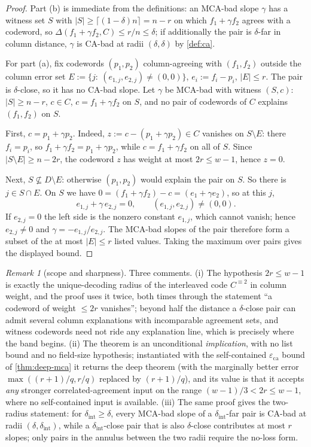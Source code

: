 \documentclass[11pt]{article}
\theoremstyle{definition}
\theoremstyle{remark}
\newtheorem{remark}[remark]{Remark}
\newcommand{\eca}{\varepsilon_{\mathrm{ca}}}
\newcommand{\dist}{\Delta}
\begin{document}
\begin{proof}
Part \textup{(b)} is immediate from the definitions: an MCA-bad slope $\gamma$ has a witness set $S$ with $|S|\ge\lceil(1-\delta)n\rceil=n-r$ on which $f_1+\gamma f_2$ agrees with a codeword, so $\dist(f_1+\gamma f_2,C)\le r/n\le\delta$; if additionally the pair is $\delta$-far in column distance, $\gamma$ is CA-bad at radii $(\delta,\delta)$ by \cref{def:ca}.

For part \textup{(a)}, fix codewords $(p_1,p_2)$ column-agreeing with $(f_1,f_2)$ outside the column error set $E:=\{j:\ (e_{1,j},e_{2,j})\ne(0,0)\}$, $e_i:=f_i-p_i$, $|E|\le r$. The pair is $\delta$-close, so it has no CA-bad slope. Let $\gamma$ be MCA-bad with witness $(S,c)$: $|S|\ge n-r$, $c\in C$, $c=f_1+\gamma f_2$ on $S$, and no pair of codewords of $C$ explains $(f_1,f_2)$ on $S$.

First, $c=p_1+\gamma p_2$. Indeed, $z:=c-(p_1+\gamma p_2)\in C$ vanishes on $S\setminus E$: there $f_i=p_i$, so $f_1+\gamma f_2=p_1+\gamma p_2$, while $c=f_1+\gamma f_2$ on all of $S$. Since $|S\setminus E|\ge n-2r$, the codeword $z$ has weight at most $2r\le w-1$, hence $z=0$.

Next, $S\not\subseteq D\setminus E$: otherwise $(p_1,p_2)$ would explain the pair on $S$. So there is $j\in S\cap E$. On $S$ we have $0=(f_1+\gamma f_2)-c=(e_1+\gamma e_2)$, so at this $j$,
\[
e_{1,j}+\gamma\,e_{2,j}=0,\qquad (e_{1,j},e_{2,j})\ne(0,0).
\]
If $e_{2,j}=0$ the left side is the nonzero constant $e_{1,j}$, which cannot vanish; hence $e_{2,j}\ne0$ and $\gamma=-e_{1,j}/e_{2,j}$. The MCA-bad slopes of the pair therefore form a subset of the at most $|E|\le r$ listed values. Taking the maximum over pairs gives the displayed bound.
\end{proof}

\begin{remark}[scope and sharpness]\label{rem:half-scope}
Three comments. \textup{(i)} The hypothesis $2r\le w-1$ is exactly the unique-decoding radius of the interleaved code $C^{\equiv2}$ in column weight, and the proof uses it twice, both times through the statement ``a codeword of weight $\le 2r$ vanishes''; beyond half the distance a $\delta$-close pair can admit several column explanations with incomparable agreement sets, and witness codewords need not ride any explanation line, which is precisely where the band begins. \textup{(ii)} The theorem is an unconditional \emph{implication}, with no list bound and no field-size hypothesis; instantiated with the self-contained $\eca$ bound of \cref{thm:deep-mca} it returns the deep theorem (with the marginally better error $\max((r+1)/q,r/q)$ replaced by $(r+1)/q$), and its value is that it accepts \emph{any} stronger correlated-agreement input on the range $(w-1)/3<2r\le w-1$, where no self-contained input is available. \textup{(iii)} The same proof gives the two-radius statement: for $\delta_{\mathrm{int}}\ge\delta$, every MCA-bad slope of a $\delta_{\mathrm{int}}$-far pair is CA-bad at radii $(\delta,\delta_{\mathrm{int}})$, while a $\delta_{\mathrm{int}}$-close pair that is also $\delta$-close contributes at most $r$ slopes; only pairs in the annulus between the two radii require the no-loss form.
\end{remark}
\end{document}

